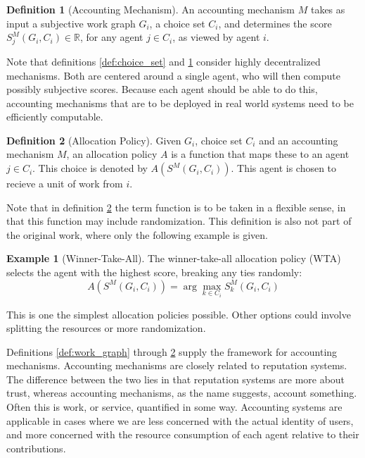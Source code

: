 \documentclass[a4paper,11pt]{book}
\newcommand{\bb}{\mathbb}
\theoremstyle{definition}
\newtheorem{definition}{Definition}
\newtheorem*{example}{Example}
\begin{document}
\begin{definition}[Accounting Mechanism]
   An accounting mechanism $M$ takes as input a subjective work graph $G_i$, a choice set $C_i$, and
   determines the score $S_j^M(G_i, C_i) \in \bb{R}$, for any agent $j \in C_i$, as viewed by agent
   $i$.
   \label{def:acc_mech}
\end{definition}

Note that definitions \ref{def:choice_set} and \ref{def:acc_mech} consider highly decentralized mechanisms.
Both are centered around a single agent, who will then compute possibly subjective scores. Because each
agent should be able to do this, accounting mechanisms that are to be deployed in real world systems need
to be efficiently computable. 

\begin{definition}[Allocation Policy]
    Given $G_i$, choice set $C_i$ and an accounting mechanism $M$, an allocation policy $A$
    is a function that maps these to an agent $j \in C_i$. This choice is denoted
    by $A(S^M(G_i, C_i))$. This agent is chosen to recieve a unit of work from $i$.
    \label{def:all_pol}
\end{definition}

Note that in definition \ref{def:all_pol} the term function is to be taken in a flexible sense,
in that this function may include randomization. This definition is also not part of the original work,
where only the following example is given.

\begin{example}[Winner-Take-All]
   The winner-take-all allocation policy (WTA) selects the agent with the highest score,
   breaking any ties randomly:
   \begin{equation*}
       A(S^M(G_i, C_i)) = \arg \max_{k\in C_i} S_k^M(G_i, C_i) 
   \end{equation*}
\end{example}

This is one the simplest allocation policies possible. Other options could involve  
splitting the resources or more randomization.

Definitions \ref{def:work_graph} through \ref{def:all_pol} supply the framework for accounting
mechanisms. Accounting mechanisms are closely related to reputation systems. The difference
between the two lies in that reputation systems are more about trust, whereas accounting mechanisms,
as the name suggests, account something. Often this is work, or service, quantified in some way.
Accounting systems are applicable in cases where we are less concerned with the actual identity
of users, and more concerned with the resource consumption of each agent relative to their contributions.
\end{document}
